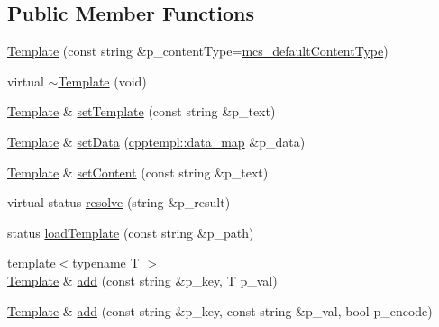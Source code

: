 \subsection*{Public Member Functions}
\begin{DoxyCompactItemize}
\item 
\hyperlink{classxtd_1_1network_1_1http_1_1Template_a1887dcae44d24a8594bc41a349a7e6fe}{Template} (const string \&p\+\_\+content\+Type=\hyperlink{classxtd_1_1network_1_1http_1_1Generator_aef564fc3152e7477bb429e45b19328fc}{mcs\+\_\+default\+Content\+Type})
\item 
virtual \hyperlink{classxtd_1_1network_1_1http_1_1Template_aa31bb4b8ade7e47fb564004bbf92c542}{$\sim$\+Template} (void)
\item 
\hyperlink{classxtd_1_1network_1_1http_1_1Template}{Template} \& \hyperlink{classxtd_1_1network_1_1http_1_1Template_a9f7dca8396a9e5092b1e293076a7ec86}{set\+Template} (const string \&p\+\_\+text)
\item 
\hyperlink{classxtd_1_1network_1_1http_1_1Template}{Template} \& \hyperlink{classxtd_1_1network_1_1http_1_1Template_ad6ba5fa3f5e0a2256cc356d1c6fd21f8}{set\+Data} (\hyperlink{namespacextd_1_1network_1_1http_1_1cpptempl_a638d1d81c8fb63c0bbafd508d6a2a007}{cpptempl\+::data\+\_\+map} \&p\+\_\+data)
\item 
\hyperlink{classxtd_1_1network_1_1http_1_1Template}{Template} \& \hyperlink{classxtd_1_1network_1_1http_1_1Template_a0c28c6cc5e8cc71bcb026ff73551c4be}{set\+Content} (const string \&p\+\_\+text)
\item 
virtual status \hyperlink{classxtd_1_1network_1_1http_1_1Template_a476ce5e5b8465ea80ade07c003ab5cfd}{resolve} (string \&p\+\_\+result)
\item 
status \hyperlink{classxtd_1_1network_1_1http_1_1Template_a1250db96f0300bf4f56aae5929e5dbb2}{load\+Template} (const string \&p\+\_\+path)
\item 
{\footnotesize template$<$typename T $>$ }\\\hyperlink{classxtd_1_1network_1_1http_1_1Template}{Template} \& \hyperlink{classxtd_1_1network_1_1http_1_1Template_aade6209a71f79db50f37ac18c0afd5a1}{add} (const string \&p\+\_\+key, T p\+\_\+val)
\item 
\hyperlink{classxtd_1_1network_1_1http_1_1Template}{Template} \& \hyperlink{classxtd_1_1network_1_1http_1_1Template_a543a79fedf08f519912e9ad42a3d3f64}{add} (const string \&p\+\_\+key, const string \&p\+\_\+val, bool p\+\_\+encode)
\end{DoxyCompactItemize}
